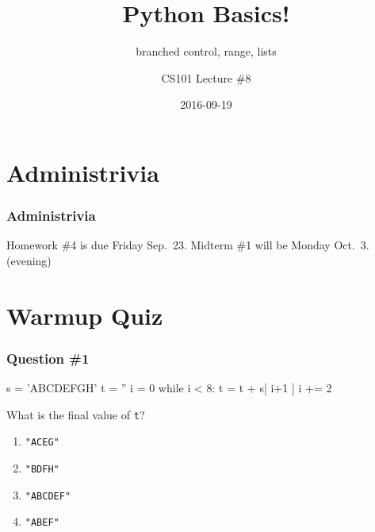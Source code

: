 \documentclass[11pt]{beamer}
\title{Python Basics!}
\subtitle{branched control, range, lists}
\author{CS101 Lecture \#8}
\date{2016-09-19}
\begin{document}
  \setcounter{showProgressBar}{0}
  \setcounter{showSlideNumbers}{0}

\frame{\titlepage}

\setcounter{framenumber}{0}
\setcounter{showProgressBar}{1}
\setcounter{showSlideNumbers}{1}

\section{Administrivia}

\begin{frame}
  \frametitle{Administrivia}
  \Enlarge
  \begin{itemize}
  \myitem  Homework \#4 is due Friday Sep.\ 23.
  \myitem  Midterm \#1 will be Monday Oct.\ 3.  (evening)
  \end{itemize}
\end{frame}

\section{Warmup Quiz}

\begin{frame}[fragile]
  \frametitle{Question \#1}
  \Enlarge

  \begin{semiverbatim}
s = 'ABCDEFGH'
t = ''
i = 0
while i < 8:
    t = t + s[ i+1 ]
    i += 2
  \end{semiverbatim}
  What is the final value of \texttt{t}?
  \begin{enumerate}[label=\Alph*]
  \item  \texttt{"ACEG"}
  \item  \texttt{"BDFH"}
  \item  \texttt{"ABCDEF"}
  \item  \texttt{"ABEF"}
  \end{enumerate}
\end{frame}
\end{document}
